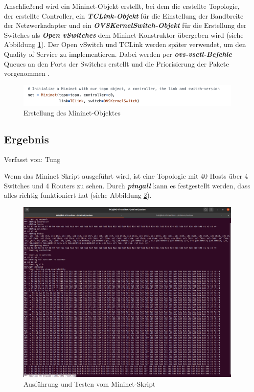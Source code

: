 \documentclass[fontsize=12pt,paper=a4,open=any,parskip=half,
  twoside=false,toc=listof,toc=bibliography,fleqn,leqno,
  captions=nooneline,captions=tableabove,british]{scrbook}
\begin{document}
Anschließend wird ein Mininet-Objekt erstellt, bei dem die erstellte Topologie, der erstellte Controller, ein \textit{\textbf{TCLink-Objekt}} für die Einstellung der Bandbreite der Netzwerkadapter und ein \textit{\textbf{OVSKernelSwitch-Objekt}} für die Erstellung der Switches als \textit{\textbf{Open vSwitches}} dem Mininet-Konstruktor übergeben wird (siehe Abbildung \ref{mininet6}). Der Open vSwitch und TCLink werden später verwendet, um den Quality of Service zu implementieren. Dabei werden per \textit{\textbf{ovs-vsctl-Befehle}} Queues an den Ports der Switches erstellt und die Priorisierung der Pakete vorgenommen \cite{qosovs}.

\begin{figure}[H]
 \centering
 \includegraphics[width=1.0\textwidth]{Bilder/mininet6}
 \captionsetup{justification=centering,margin=1cm}
 \caption{Erstellung des Mininet-Objektes}
 \label{mininet6}
\end{figure}

\subsection{Ergebnis}
{\tiny Verfasst von: Tung\par}
Wenn das Mininet Skript ausgeführt wird, ist eine Topologie mit 40 Hosts über 4 Switches und 4 Routers zu sehen. Durch \textit{\textbf{pingall}} kann es festgestellt werden, dass alles richtig funktioniert hat (siehe Abbildung \ref{pingall}).

\begin{figure}[H]
 \centering
 \includegraphics[width=1.0\textwidth]{Bilder/pingall}
 \captionsetup{justification=centering,margin=1cm}
 \caption{Ausführung und Testen vom Mininet-Skript}
 \label{pingall}
\end{figure}
\end{document}
